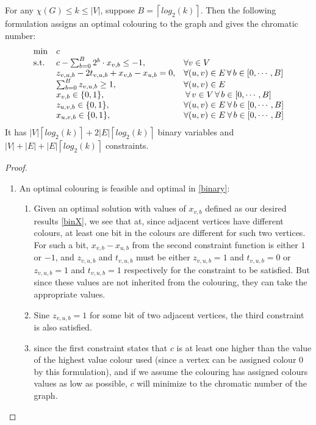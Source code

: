 \begin{proposition}
For any $\chi(G) \leq k \leq |V|$, suppose $B = \left \lceil{log_2(k)}\right \rceil$. Then the following formulation assigns an optimal colouring to the graph and gives the chromatic number:
\begin{align}\label{binary}
\begin{array}{ll@{}ll}
\text{min} &c&\\
\text{s.t.} 
&c - \sum_{b = 0}^{B}{2^b\cdot x_{v,b}} \leq -1,& \forall v\in V\\
&z_{v,u,b}-2t_{v,u,b}+x_{v,b}-x_{u,b} = 0,\quad & \forall (u,v)\in E \, \forall \, b \in [0,\cdots ,B ] \\
&\sum_{b = 0}^{B}{z_{v,u,b}} \geq 1,& \forall (u,v) \in E\\
&x_{v,b}\in\{0,1\},& \: \forall \, v \in V \, \forall \, b \in [0,\cdots ,B]\\
&z_{u,v,b}\in\{0,1\},& \forall (u,v) \in E \: \forall \, b \in [0,\cdots ,B]\\
&x_{u,v,b}\in\{0,1\},& \forall (u,v) \in E \: \forall \, b \in [0,\cdots ,B]\\
\end{array}
\end{align}
\noindent It has $|V|\left \lceil{log_2(k)}\right \rceil + 2|E|\left \lceil{log_2(k)}\right \rceil$ binary variables and $|V|+|E|+|E|\left \lceil{log_2(k)}\right \rceil$ constraints.
\begin{proof}
\begin{enumerate}
\item An optimal colouring is feasible and optimal in \ref{binary}:\\
\begin{enumerate}
\item Given an optimal solution with values of $x_{v,b}$ defined as our desired results \ref{binX}, we see that at, since adjacent vertices have different colours, at least one bit in the colours are different for such two vertices.\\
For such a bit, $x_{v,b}-x_{u,b}$ from the second constraint function is either $1$ or $-1$, and $z_{v,u,b}$ and $t_{v,u,b}$ must be either $z_{v,u,b} = 1$ and $t_{v,u,b} = 0$ or $z_{v,u,b} = 1$ and $t_{v,u,b} = 1$ respectively for the constraint to be satisfied. But since these values are not inherited from the colouring, they can take the appropriate values. 
\item Sine $z_{v,u,b} = 1$ for some bit of two adjacent vertices, the third constraint is also satisfied.
\item since the first constraint states that $c$ is at least one higher than the value of the highest value colour used (since a vertex can be assigned colour $0$ by this formulation), and if we assume the colouring has assigned colours values as low as possible, $c$ will minimize to the chromatic number of the graph.

\end{enumerate}
\end{enumerate}
\end{proof}
\end{proposition}
